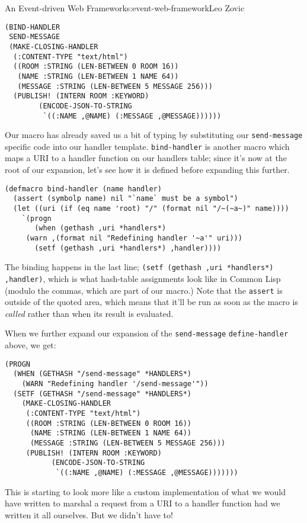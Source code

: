 \begin{aosachapter}{An Event-driven Web Framework}{s:event-web-framework}{Leo Zovic}
\begin{verbatim}
(BIND-HANDLER
 SEND-MESSAGE
 (MAKE-CLOSING-HANDLER
  (:CONTENT-TYPE "text/html")
  ((ROOM :STRING (LEN-BETWEEN 0 ROOM 16))
   (NAME :STRING (LEN-BETWEEN 1 NAME 64))
   (MESSAGE :STRING (LEN-BETWEEN 5 MESSAGE 256)))
  (PUBLISH! (INTERN ROOM :KEYWORD)
        (ENCODE-JSON-TO-STRING
         `((:NAME ,@NAME) (:MESSAGE ,@MESSAGE))))))
\end{verbatim}

Our macro has already saved us a bit of typing by substituting our
\texttt{send-message} specific code into our handler template.
\texttt{bind-handler} is another macro which maps a URI to a handler
function on our handlers table; since it's now at the root of our
expansion, let's see how it is defined before expanding this further.

\begin{verbatim}
(defmacro bind-handler (name handler)
  (assert (symbolp name) nil "`name` must be a symbol")
  (let ((uri (if (eq name 'root) "/" (format nil "/~(~a~)" name))))
    `(progn
       (when (gethash ,uri *handlers*)
     (warn ,(format nil "Redefining handler '~a'" uri)))
       (setf (gethash ,uri *handlers*) ,handler))))
\end{verbatim}

The binding happens in the last line;
\texttt{(setf (gethash ,uri *handlers*) ,handler)}, which is what
hash-table assignments look like in Common Lisp (modulo the commas,
which are part of our macro.) Note that the \texttt{assert} is outside
of the quoted area, which means that it'll be run as soon as the macro
is \emph{called} rather than when its result is evaluated.

When we further expand our expansion of the \texttt{send-message}
\texttt{define-handler} above, we get:

\begin{verbatim}
(PROGN
  (WHEN (GETHASH "/send-message" *HANDLERS*)
    (WARN "Redefining handler '/send-message'"))
  (SETF (GETHASH "/send-message" *HANDLERS*)
    (MAKE-CLOSING-HANDLER
     (:CONTENT-TYPE "text/html")
     ((ROOM :STRING (LEN-BETWEEN 0 ROOM 16))
      (NAME :STRING (LEN-BETWEEN 1 NAME 64))
      (MESSAGE :STRING (LEN-BETWEEN 5 MESSAGE 256)))
     (PUBLISH! (INTERN ROOM :KEYWORD)
           (ENCODE-JSON-TO-STRING
            `((:NAME ,@NAME) (:MESSAGE ,@MESSAGE)))))))
\end{verbatim}

This is starting to look more like a custom implementation of what we
would have written to marshal a request from a URI to a handler function
had we written it all ourselves. But we didn't have to!


\end{aosachapter}
